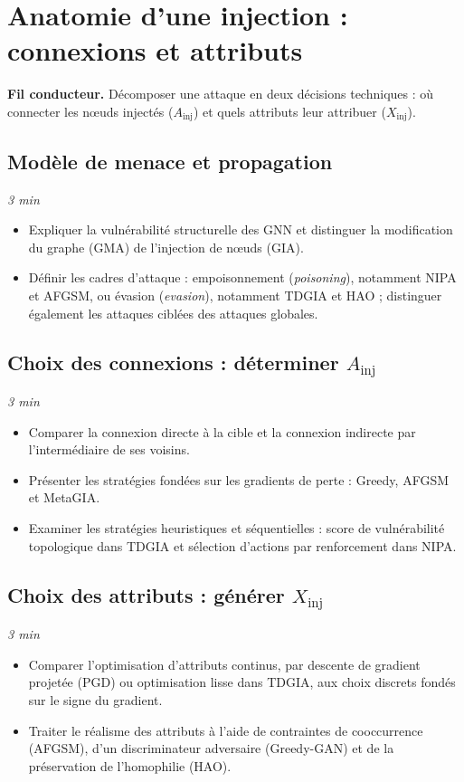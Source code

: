 \documentclass[11pt,a4paper]{article}
\newcommand{\duree}[1]{\hfill\textit{#1}}
\begin{document}
\section{Anatomie d'une injection : connexions et attributs}

\textbf{Fil conducteur.} Décomposer une attaque en deux décisions techniques :
où connecter les nœuds injectés ($A_{\text{inj}}$) et quels attributs leur
attribuer ($X_{\text{inj}}$).

\subsection{Modèle de menace et propagation}\duree{3 min}
\begin{itemize}
    \item Expliquer la vulnérabilité structurelle des GNN et distinguer la
    modification du graphe (GMA) de l'injection de nœuds (GIA).
    \item Définir les cadres d'attaque : empoisonnement (\textit{poisoning}),
    notamment NIPA et AFGSM, ou évasion (\textit{evasion}), notamment TDGIA et
    HAO ; distinguer également les attaques ciblées des attaques globales.
\end{itemize}

\subsection{Choix des connexions : déterminer \texorpdfstring{$A_{\text{inj}}$}{A inj}}\duree{3 min}
\begin{itemize}
    \item Comparer la connexion directe à la cible et la connexion indirecte par
    l'intermédiaire de ses voisins.
    \item Présenter les stratégies fondées sur les gradients de perte : Greedy,
    AFGSM et MetaGIA.
    \item Examiner les stratégies heuristiques et séquentielles : score de
    vulnérabilité topologique dans TDGIA et sélection d'actions par renforcement
    dans NIPA.
\end{itemize}

\subsection{Choix des attributs : générer \texorpdfstring{$X_{\text{inj}}$}{X inj}}\duree{3 min}
\begin{itemize}
    \item Comparer l'optimisation d'attributs continus, par descente de gradient
    projetée (PGD) ou optimisation lisse dans TDGIA, aux choix discrets fondés
    sur le signe du gradient.
    \item Traiter le réalisme des attributs à l'aide de contraintes de
    cooccurrence (AFGSM), d'un discriminateur adversaire (Greedy-GAN) et de la
    préservation de l'homophilie (HAO).
\end{itemize}
\end{document}
